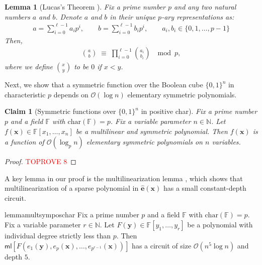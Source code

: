 \documentclass[11pt]{article}
\newtheorem{lemma}[theorem]{Lemma}
\newtheorem{claim}[theorem]{Claim}
\newcommand{\Boo}{\{0,1 \}}
\newcommand{\bigO}{\mathcal{O}}
\newcommand{\F}{\mathbb{F}}
\newcommand{\ml}{\mathsf{ml}}
\begin{document}
\begin{lemma}[Lucas's Theorem \cite{Lucas}]\label{lemma:lucas}
Fix a prime number $p$ and any two natural numbers $a$ and $b$. Denote $a$ and $b$ in their unique $p$-ary representations as:
\begin{align*}
    a = \sum_{i = 0}^{\ell - 1} a_{i} p^{i}, \quad \quad b = \sum_{i = 0}^{\ell - 1} b_{i} p^{i}, \quad \quad  a_{i}, b_{i} \in \{0,1,\ldots, p-1\}
\end{align*}
Then,
\begin{align*}
    \displaystyle\binom{a}{b} \; \equiv \; \prod_{i = 0}^{\ell - 1} \displaystyle\binom{a_{i}}{b_{i}} \; \mod{p},
\end{align*}
where we define $\binom{x}{y}$ to be $0$ if $x < y$.
\end{lemma}

Next, we show that a symmetric function over the Boolean cube $\Boo^{n}$ in characteristic $p$ depends on $\bigO(\log n)$ elementary symmetric polynomials.

\begin{claim}[Symmetric functions over $\Boo^{n}$ in positive char]\label{claim:sym-char-p}
Fix a prime number $p$ and a field $\F$ with $\mathrm{char}(\F) = p$. Fix a variable parameter $n \in \mathbb{N}$.\newline
Let $f(\mathbf{x}) \in \F[x_{1},\ldots, x_{n}]$ be a multilinear and symmetric polynomial. Then $f(\mathbf{x})$ is a function of $\bigO(\log_{p} n)$ elementary symmetric polynomials on $n$ variables.
\end{claim}
\begin{proof}\textcolor{red}{TOPROVE 8}\end{proof}


A key lemma in our proof is the multilinearization lemma , which shows that multilinearization of a sparse polynomial in $\widehat{\mathbf{e}}(\mathbf{x})$ has a small constant-depth circuit.\\

\begin{restatable}{lemma}{multsymposchar}\label{lemma:multilinearize-char-p}
Fix a prime number $p$ and a field $\F$ with $\mathrm{char}(\F) = p$. Fix a variable parameter $r \in \mathbb{N}$.\newline
Let $F(\mathbf{y}) \in \F[y_{1},\ldots,y_{r}]$ be a polynomial with individual degree strictly less than $p$. Then \break $\ml[F(e_{1}(\mathbf{y}), e_{p}(\mathbf{x}), \ldots, e_{p^{r-1}}(\mathbf{x}))]$ has a circuit of size $\bigO( n^{5} \log n)$ and depth $5$.    
\end{restatable}
\end{document}
